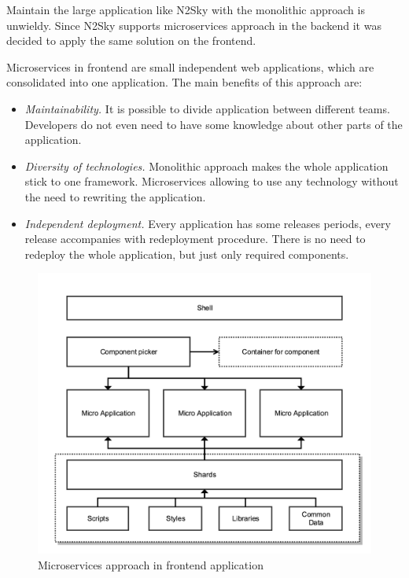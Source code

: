 \documentclass[10pt, conference, compsocconf]{IEEEtran}
\begin{document}
Maintain the large application like N2Sky with the monolithic approach is unwieldy. Since N2Sky supports microservices approach in the backend it was decided to apply the same solution on the frontend.  

Microservices in frontend are small independent web applications, which are consolidated into one application. The main benefits of this approach are:


\begin{itemize}
\item \emph{Maintainability.} It is possible to divide application between different teams. Developers do not even need to have some knowledge about other parts of the application. 
\item \emph{Diversity of technologies.} Monolithic approach makes the whole application stick to one framework. Microservices allowing to use any technology without the need to rewriting the application.
\item \emph{Independent deployment.} Every application has some releases periods, every release accompanies with redeployment procedure. There is no need to redeploy the whole application, but just only required components.
\end{itemize}

\begin{figure}[H]
  \includegraphics[width=\linewidth]{img/frontend_arch.png}
  \caption{Microservices approach in frontend application}
  \label{fig:frontend_arch}
\end{figure}
\end{document}
